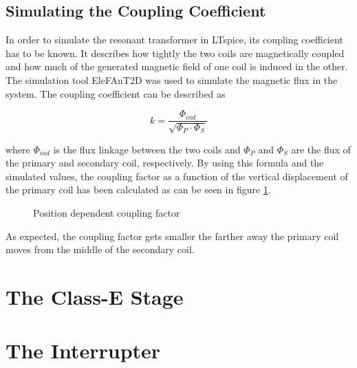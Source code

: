\subsection{Simulating the Coupling Coefficient}

In order to simulate the resonant transformer in LTspice, its coupling coefficient has to be known. It describes how tightly the two coils are magnetically coupled and how much of the generated magnetic field of one coil is induced in the other. The simulation tool EleFAnT2D was used to simulate the magnetic flux in the system. The coupling coefficient can be described as

\begin{equation}
    k = \frac{\Phi_{ind}}{\sqrt{\Phi_P \cdot \Phi_S}}
\end{equation}

where \(\Phi_{ind}\) is the flux linkage between the two coils and \(\Phi_P\) and \(\Phi_S\) are the flux of the primary and secondary coil, respectively. By using this formula and the simulated values, the coupling factor as a function of the vertical displacement of the primary coil has been calculated as can be seen in figure \ref{fig:coupling-factor}.

\begin{figure}[h!]
    \centering
    \caption{Position dependent coupling factor}
    \label{fig:coupling-factor}
\end{figure}

As expected, the coupling factor gets smaller the farther away the primary coil moves from the middle of the secondary coil.

\section{The Class-E Stage}

\section{The Interrupter}
